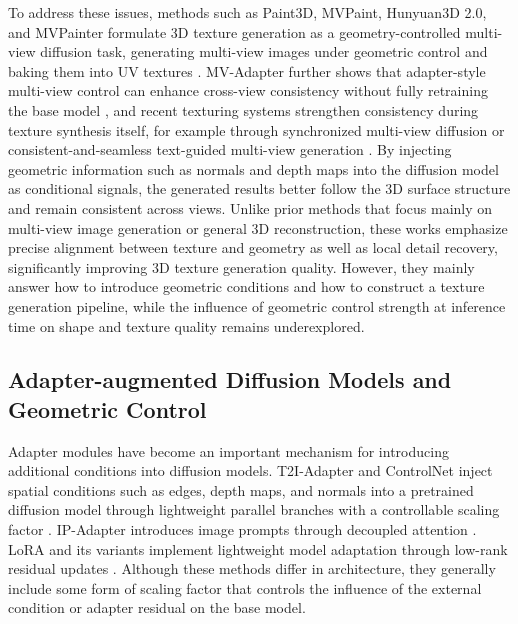 \documentclass[times,twocolumn,final]{elsarticle}
\begin{document}
To address these issues, methods such as Paint3D, MVPaint, Hunyuan3D 2.0, and MVPainter formulate 3D texture generation as a geometry-controlled multi-view diffusion task, generating multi-view images under geometric control and baking them into UV textures \cite{zeng2024paint3d,cheng2024mvpaint,lai2025hunyuan3d,shao2025mvpainter}. MV-Adapter further shows that adapter-style multi-view control can enhance cross-view consistency without fully retraining the base model \cite{huang2024mvadapter}, and recent texturing systems strengthen consistency during texture synthesis itself, for example through synchronized multi-view diffusion \cite{liu2024synchronized} or consistent-and-seamless text-guided multi-view generation \cite{xu2026wondertex}. By injecting geometric information such as normals and depth maps into the diffusion model as conditional signals, the generated results better follow the 3D surface structure and remain consistent across views. Unlike prior methods that focus mainly on multi-view image generation or general 3D reconstruction, these works emphasize precise alignment between texture and geometry as well as local detail recovery, significantly improving 3D texture generation quality. However, they mainly answer how to introduce geometric conditions and how to construct a texture generation pipeline, while the influence of geometric control strength at inference time on shape and texture quality remains underexplored.

\subsection{Adapter-augmented Diffusion Models and Geometric Control}
\label{subsec:adapter}

Adapter modules have become an important mechanism for introducing additional conditions into diffusion models. T2I-Adapter and ControlNet inject spatial conditions such as edges, depth maps, and normals into a pretrained diffusion model through lightweight parallel branches with a controllable scaling factor \cite{mou2023t2iadapter,zhang2023controlnet}. IP-Adapter introduces image prompts through decoupled attention \cite{ye2023ipadapter}. LoRA and its variants implement lightweight model adaptation through low-rank residual updates \cite{hu2022lora,liu2024dora,zhang2023adalora}. Although these methods differ in architecture, they generally include some form of scaling factor that controls the influence of the external condition or adapter residual on the base model.
\end{document}
